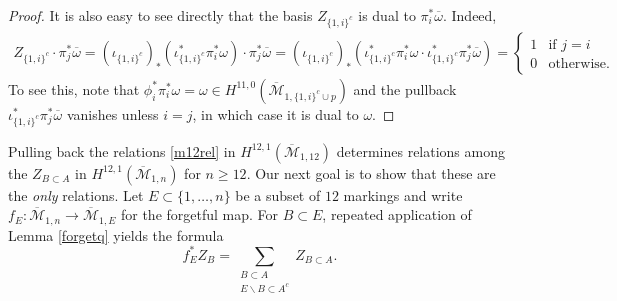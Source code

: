 \documentclass[12pt]{amsart}
\theoremstyle{definition}
\numberwithin{equation}{section}
\newcommand{\M}{\mathcal{M}}
\newcommand{\Mb}{\overline{\M}}
\theoremstyle{definition} %
\theoremstyle{remark}
\begin{document}
\begin{proof}
It is also easy to see directly that the basis $Z_{\{1,i\}^c}$ is dual to $\pi_i^*\overline{\omega}$. Indeed,
\begin{align*}
Z_{\{1,i\}^c} \cdot \pi_j^*\overline{\omega} = (\iota_{\{1,i\}^c})_*(\iota_{\{1,i\}^c}^*\pi_i^*\omega) \cdot \pi_j^*\overline{\omega} = (\iota_{\{1,i\}^c})_*(\iota_{\{1,i\}^c}^*\pi_i^*\omega \cdot \iota_{\{1,i\}^c}^*\pi_j^*\overline{\omega}) = \begin{cases} 1 & \text{if $j = i$} \\ 0 & \text{otherwise.}\end{cases}
\end{align*}
To see this, note that $\phi_i^*\pi_i^*\omega = \omega \in H^{11,0}(\Mb_{1,\{1,i\}^c \cup p})$ and the pullback $\iota_{\{1,i\}^c}^*\pi_j^*\overline{\omega}$ vanishes unless $i = j$, in which case it is dual to $\omega$.
\end{proof}

Pulling back the relations \eqref{m12rel} in $H^{12,1}(\Mb_{1,12})$ determines relations among the $Z_{B \subset A}$ in $H^{12,1}(\Mb_{1,n})$ for $n \geq 12$. Our next goal is to show that these are the \emph{only} relations. Let $E \subset \{1, \ldots, n\}$ be a subset of $12$ markings and write $f_E \colon \Mb_{1,n} \to \Mb_{1,E}$ for the forgetful map. For $B \subset E$, repeated application 
of Lemma \ref{forgetq} yields the formula
\begin{equation} \label{fE}
f_E^*Z_{B} = \sum_{\substack{B \subset A \\ E \smallsetminus B \subset A^c} } Z_{B \subset A}.
\end{equation}
\end{document}
